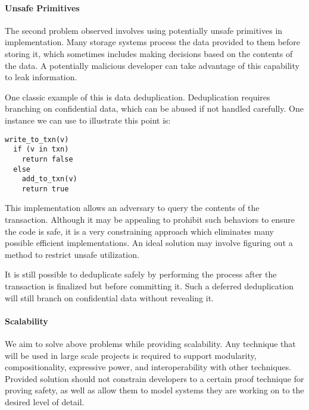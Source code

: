 \documentclass[onecolumn]{paper}
\begin{document}
\paragraph{Unsafe Primitives}
The second problem observed involves using potentially unsafe primitives in implementation. Many storage systems process the data provided to them before storing it, which sometimes includes making decisions based on the contents of the data. A potentially malicious developer can take advantage of this capability to leak information. 

One classic example of this is data deduplication. Deduplication requires branching on confidential data, which can be abused if not handled carefully. One instance we can use to illustrate this point is:


\begin{lstlisting}
write_to_txn(v)
  if (v in txn)
    return false
  else
    add_to_txn(v)
    return true
\end{lstlisting}

This implementation allows an adversary to query the contents of the transaction. Although it may be appealing to prohibit such behaviors to ensure the code is safe, it is a very constraining approach which eliminates many possible efficient implementations. An ideal solution may involve figuring out a method to restrict unsafe utilization. 


It is still possible to deduplicate safely by performing the process after the  transaction is finalized but before committing it. Such a deferred deduplication will still branch on confidential data without revealing it.


\paragraph{Scalability}
We aim to solve above problems while providing scalability. Any technique that will be used in large scale projects is required to support modularity, compositionality, expressive power, and interoperability with other techniques. Provided solution should not constrain developers to a certain proof technique for proving safety, as well as allow them to model systems they are working on to the desired level of detail. 
\end{document}
